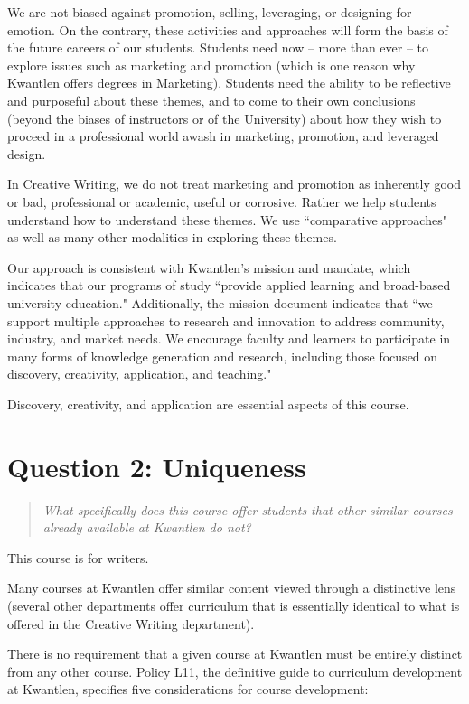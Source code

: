 \documentclass[letterpaper,10pt,headsepline]{scrreprt}
\begin{document}
We are not biased against promotion, selling, leveraging, or designing for emotion. On the contrary, these activities and approaches will form the basis of the future careers of our students. Students need now -- more than ever -- to explore issues such as marketing and promotion (which is one reason why Kwantlen offers degrees in Marketing). Students need the ability to be reflective and purposeful about these themes, and to come to their own conclusions (beyond the biases of instructors or of the University) about how they wish to proceed in a professional world awash in marketing, promotion, and leveraged design.

In Creative Writing, we do not treat marketing and promotion as inherently good or bad, professional or academic, useful or corrosive. Rather we help students understand how to understand these themes. We use ``comparative approaches" as well as many other modalities in exploring these themes.

Our approach is consistent with Kwantlen's mission and mandate, which indicates that our programs of study ``provide applied learning and broad-based university education." Additionally, the mission document indicates that ``we support multiple approaches to research and innovation to address community, industry, and market needs. We encourage faculty and learners to participate in many forms of knowledge generation and research, including those focused on discovery, creativity, application, and teaching."

Discovery, creativity, and application are essential aspects of this course.


\section{Question 2: Uniqueness}

\begin{quote}
\textit{What specifically does this course offer students that other similar courses already available at Kwantlen do not?}
\end{quote}

This course is for writers.

Many courses at Kwantlen offer similar content viewed through a distinctive lens (several other departments offer curriculum that is essentially identical to what is offered in the Creative Writing department).

There is no requirement that a given course at Kwantlen must be entirely distinct from any other course. Policy L11, the definitive guide to curriculum development at Kwantlen, specifies five considerations for course development:
\end{document}
